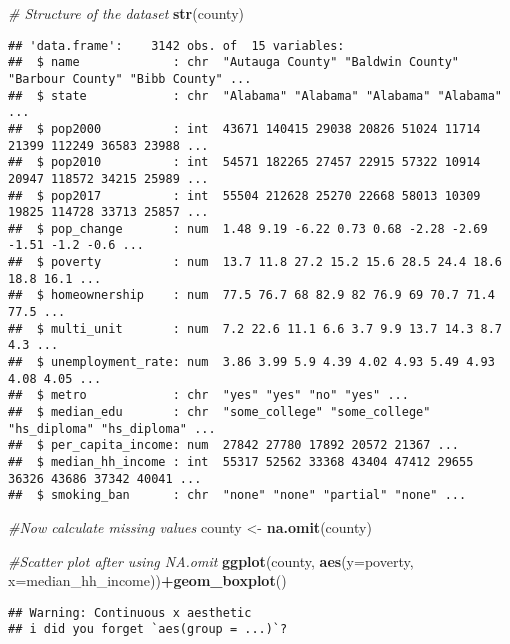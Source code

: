\documentclass[
]{article}
\newenvironment{Shaded}{\begin{snugshade}}{\end{snugshade}}
\newcommand{\AttributeTok}[1]{\textcolor[rgb]{0.13,0.29,0.53}{#1}}
\newcommand{\CommentTok}[1]{\textcolor[rgb]{0.56,0.35,0.01}{\textit{#1}}}
\newcommand{\FunctionTok}[1]{\textcolor[rgb]{0.13,0.29,0.53}{\textbf{#1}}}
\newcommand{\NormalTok}[1]{#1}
\newcommand{\OtherTok}[1]{\textcolor[rgb]{0.56,0.35,0.01}{#1}}
\newcommand{\SpecialCharTok}[1]{\textcolor[rgb]{0.81,0.36,0.00}{\textbf{#1}}}
\begin{document}
\begin{Shaded}
\begin{Highlighting}[]
\CommentTok{\# Structure of the dataset}
\FunctionTok{str}\NormalTok{(county)}
\end{Highlighting}
\end{Shaded}

\begin{verbatim}
## 'data.frame':    3142 obs. of  15 variables:
##  $ name             : chr  "Autauga County" "Baldwin County" "Barbour County" "Bibb County" ...
##  $ state            : chr  "Alabama" "Alabama" "Alabama" "Alabama" ...
##  $ pop2000          : int  43671 140415 29038 20826 51024 11714 21399 112249 36583 23988 ...
##  $ pop2010          : int  54571 182265 27457 22915 57322 10914 20947 118572 34215 25989 ...
##  $ pop2017          : int  55504 212628 25270 22668 58013 10309 19825 114728 33713 25857 ...
##  $ pop_change       : num  1.48 9.19 -6.22 0.73 0.68 -2.28 -2.69 -1.51 -1.2 -0.6 ...
##  $ poverty          : num  13.7 11.8 27.2 15.2 15.6 28.5 24.4 18.6 18.8 16.1 ...
##  $ homeownership    : num  77.5 76.7 68 82.9 82 76.9 69 70.7 71.4 77.5 ...
##  $ multi_unit       : num  7.2 22.6 11.1 6.6 3.7 9.9 13.7 14.3 8.7 4.3 ...
##  $ unemployment_rate: num  3.86 3.99 5.9 4.39 4.02 4.93 5.49 4.93 4.08 4.05 ...
##  $ metro            : chr  "yes" "yes" "no" "yes" ...
##  $ median_edu       : chr  "some_college" "some_college" "hs_diploma" "hs_diploma" ...
##  $ per_capita_income: num  27842 27780 17892 20572 21367 ...
##  $ median_hh_income : int  55317 52562 33368 43404 47412 29655 36326 43686 37342 40041 ...
##  $ smoking_ban      : chr  "none" "none" "partial" "none" ...
\end{verbatim}

\begin{Shaded}
\begin{Highlighting}[]
\CommentTok{\#Now calculate missing values}
\NormalTok{county }\OtherTok{\textless{}{-}} \FunctionTok{na.omit}\NormalTok{(county)}

\CommentTok{\#Scatter plot after using NA.omit}
\FunctionTok{ggplot}\NormalTok{(county, }\FunctionTok{aes}\NormalTok{(}\AttributeTok{y=}\NormalTok{poverty, }\AttributeTok{x=}\NormalTok{median\_hh\_income))}\SpecialCharTok{+}\FunctionTok{geom\_boxplot}\NormalTok{()}
\end{Highlighting}
\end{Shaded}

\begin{verbatim}
## Warning: Continuous x aesthetic
## i did you forget `aes(group = ...)`?
\end{verbatim}
\end{document}
